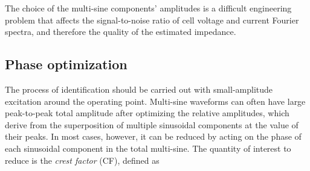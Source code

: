 The choice of the multi-sine components' amplitudes is a difficult engineering problem that affects the signal-to-noise ratio of cell voltage and current Fourier spectra, and therefore the quality of the estimated impedance.





\subsection{Phase optimization}
The process of identification should be carried out with small-amplitude excitation around the operating point.
Multi-sine waveforms can often have large peak-to-peak total amplitude after optimizing the relative amplitudes, which derive from the superposition of multiple sinusoidal components at the value of their peaks.
In most cases, however, it can be reduced by acting on the phase of each sinusoidal component in the total multi-sine.
The quantity of interest to reduce is the \textit{crest factor} (CF), defined as

